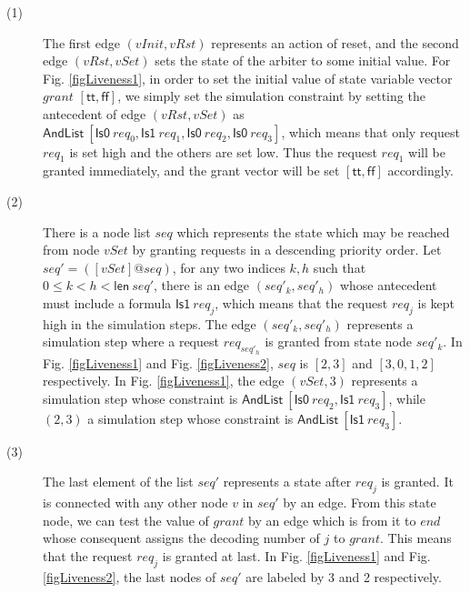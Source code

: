 \documentclass[final]{IEEEtran}
\newcommand{\mathid}[1]{\ensuremath{\mathit{#1}}}
\begin{document}
\begin{description}
\item[(1)] The first edge $(\mathid{vInit}, \mathid{vRst})$
represents an action of reset, and the second edge
$(\mathid{vRst},\mathid{vSet})$ sets the state of the arbiter to
some initial value. For Fig. \ref{figLiveness1}, in order to set the
initial value of state variable vector $grant$
$[\mathsf{tt},\mathsf{ff}]$, we simply set the simulation constraint
by setting the antecedent of edge $(\mathid{vRst},\mathid{vSet})$ as
$\mathsf{AndList}\ [\mathsf{Is0}\ req_0, \mathsf{Is1}\
req_1,\mathsf{Is0}\ req_2,\mathsf{Is0}\ req_3]$, which means that
only request $req_1$ is set high and the others are set low. Thus
the
request  $req_1$ will be granted immediately, and the grant vector will be set $%
[\mathsf{tt,ff}] $ accordingly.

\item[(2)]There is a  node list $seq $ which
represents the state
 which may be reached from node $vSet$ by granting requests in a descending
priority order. Let $seq'=([vSet]@seq)$,
for any two indices $k,h$ such that $0\leq k<h< \mathsf{len}\ seq'$, there is an edge $(%
seq'_k,seq'_h)$ whose antecedent must include a formula
$\mathsf{Is1}\ req_j$, which means that the request $req_j$ is kept
high in the
simulation steps. The edge $(%
seq'_k,seq'_h)$ represents a simulation step where a request
$req_{seq'_h}$ is granted from state node $seq'_k$. In Fig.
\ref{figLiveness1} and Fig. \ref{figLiveness2}, $seq$ is $[2,3]$ and
$[3,0,1,2]$ respectively. In Fig. \ref{figLiveness1}, the edge
$(vSet,3)$ represents a simulation step whose constraint is
$\mathsf{AndList}\ [\mathsf{Is0}\ req_2,\mathsf{Is1}\ req_3]$, while
$(2,3)$   a simulation step whose constraint is $\mathsf{AndList}\
[\mathsf{Is1}\ req_3]$.




\item[(3)] %
The last element of the list $seq'$ represents a state after $req_j$
is granted. It is connected with any other node $v$ in $seq'$ by an
edge. From this state node, we can test the value of $grant$ by an
edge which is from it to $end$ whose   consequent assigns the
decoding number of $j$ to $grant$. This means that the request
$req_j$ is granted at last.
 In Fig. \ref{figLiveness1} and
Fig. \ref{figLiveness2}, the last nodes of $seq'$ are labeled by 3 and 2
respectively.


\end{description}
\end{document}

